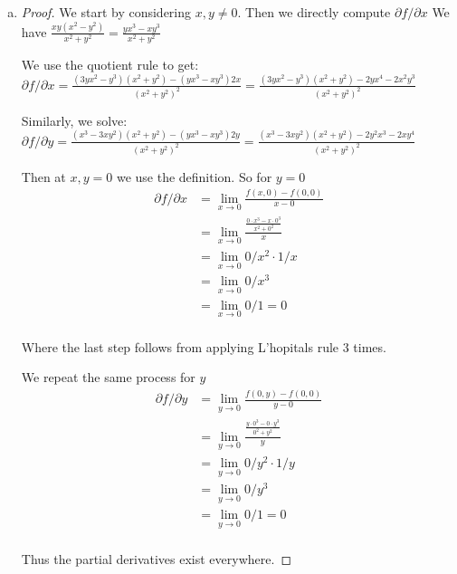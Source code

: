 \documentclass[11pt]{article}
\begin{document}
\begin{enumerate}[(a)]
    \item 
    \begin{proof}
        We start by considering $x, y \neq 0$. Then we directly compute $\partial f / \partial x$
        We have $\frac{xy(x^2-y^2)}{x^2 + y^2} = \frac{yx^3-xy^3}{x^2 + y^2}$

        We use the quotient rule to get: 
        $\partial f / \partial x = \frac{(3yx^2 - y^3)(x^2 + y^2)  - (yx^3-xy^3)2x}{(x^2 + y^2)^2} = \frac{(3yx^2 - y^3)(x^2 + y^2) - 2yx^4-2x^2y^3}{(x^2 + y^2)^2}$

        Similarly, we solve: $\partial f / \partial y = \frac{(x^3 - 3xy^2)(x^2+ y^2) - (yx^3-xy^3)2y}{(x^2 + y^2)^2} = \frac{(x^3 - 3xy^2)(x^2 + y^2) - 2y^2x^3-2xy^4}{(x^2 + y^2)^2}$
        
        Then at $x, y = 0$ we use the definition. 
        So for $y = 0$
        \begin{align*}
            \partial f / \partial x &= \lim_{x \to 0} \frac{f(x,0) - f(0,0)}{x - 0}\\
            &= \lim_{x \to 0} \frac{\frac{0 \cdot x^3-x \cdot 0^3}{x^2 + 0^2}}{x} \\
            &= \lim_{x \to 0} 0/x^2 \cdot 1/x \\
            &= \lim_{x \to 0} 0/x^3 \\
            &=  \lim_{x \to 0} 0/1 = 0 \\
        \end{align*}
        
        Where the last step follows from applying L'hopitals rule 3 times.

        We repeat the same process for $y$
        \begin{align*}
            \partial f / \partial y &= \lim_{y \to 0} \frac{f(0,y) - f(0,0)}{y - 0}\\
            &= \lim_{y \to 0} \frac{\frac{y \cdot 0^3- 0 \cdot y^3}{0^2 + y^2}}{y} \\
            &= \lim_{y \to 0} 0/y^2 \cdot 1/y \\
            &= \lim_{y \to 0} 0/y^3 \\
            &=  \lim_{y \to 0} 0/1 = 0 \\
        \end{align*}

        Thus the partial derivatives exist everywhere.

    \end{proof}






\end{enumerate}
\end{document}
